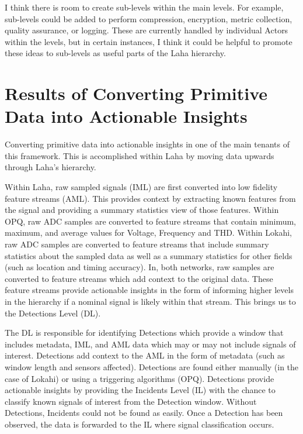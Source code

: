 I think there is room to create sub-levels within the main levels. For example, sub-levels could be added to perform compression, encryption, metric collection, quality assurance, or logging. These are currently handled by individual Actors within the levels, but in certain instances, I think it could be helpful to promote these ideas to sub-levels as useful parts of the Laha hierarchy.

\section{Results of Converting Primitive Data into Actionable Insights}\label{sec:results-of-converting-primitie-data-into-actional-insights}

Converting primitive data into actionable insights in one of the main tenants of this framework. This is accomplished within Laha by moving data upwards through Laha's hierarchy.

Within Laha, raw sampled signals (IML) are first converted into low fidelity feature streams (AML). This provides context by extracting known features from the signal and providing a summary statistics view of those features. Within OPQ, raw ADC samples are converted to feature streams that contain minimum, maximum, and average values for Voltage, Frequency and THD. Within Lokahi, raw ADC samples are converted to feature streams that include summary statistics about the sampled data as well as a summary statistics for other fields (such as location and timing accuracy). In, both networks, raw samples are converted to feature streams which add context to the original data. These feature streams provide actionable insights in the form of informing higher levels in the hierarchy if a nominal signal is likely within that stream. This brings us to the Detections Level (DL).

The DL is responsible for identifying Detections which provide a window that includes metadata, IML, and AML data which may or may not include signals of interest. Detections add context to the AML in the form of metadata (such as window length and sensors affected). Detections are found either manually (in the case of Lokahi) or using a triggering algorithms (OPQ). Detections provide actionable insights by providing the Incidents Level (IL) with the chance to classify known signals of interest from the Detection window. Without Detections, Incidents could not be found as easily. Once a Detection has been observed, the data is forwarded to the IL where signal classification occurs.

